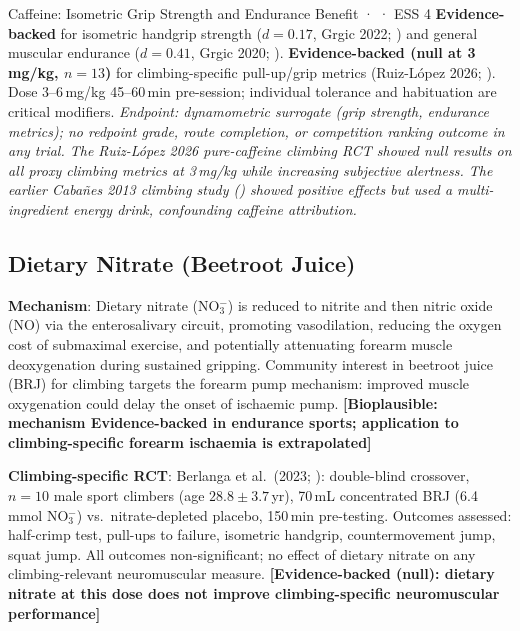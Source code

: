 \begin{evidencebox}{Caffeine: Isometric Grip Strength and Endurance Benefit · \evidencebacked · ESS 4}
\textbf{Evidence-backed} for isometric handgrip strength ($d{=}0.17$, Grgic 2022; \cite{Grg22}) and general muscular endurance ($d{=}0.41$, Grgic 2020; \cite{GGP+19}). \textbf{Evidence-backed (null at 3\,mg/kg, $n{=}13$)} for climbing-specific pull-up/grip metrics (Ruiz-L\'opez 2026; \cite{RLMAMR+26}). Dose 3--6\,mg/kg 45--60\,min pre-session; individual tolerance and habituation are critical modifiers. \textit{Endpoint: dynamometric surrogate (grip strength, endurance metrics); no redpoint grade, route completion, or competition ranking outcome in any trial. The Ruiz-L\'opez 2026 pure-caffeine climbing RCT showed null results on all proxy climbing metrics at 3\,mg/kg while increasing subjective alertness. The earlier Caba{\~n}es 2013 climbing study (\cite{Cab13}) showed positive effects but used a multi-ingredient energy drink, confounding caffeine attribution.}
\end{evidencebox}

\subsection{Dietary Nitrate (Beetroot Juice)}
\label{subsec:nitrate}

\textbf{Mechanism}: Dietary nitrate (NO$_3^-$) is reduced to nitrite and then nitric oxide (NO) via the enterosalivary circuit, promoting vasodilation, reducing the oxygen cost of submaximal exercise, and potentially attenuating forearm muscle deoxygenation during sustained gripping. Community interest in beetroot juice (BRJ) for climbing targets the forearm pump mechanism: improved muscle oxygenation could delay the onset of ischaemic pump. \textbf{[Bioplausible: mechanism Evidence-backed in endurance sports; application to climbing-specific forearm ischaemia is extrapolated]}

\textbf{Climbing-specific RCT}: Berlanga et al.\ (2023; \cite{BLSML+23}): double-blind crossover, $n{=}10$ male sport climbers (age $28.8{\pm}3.7$\,yr), 70\,mL concentrated BRJ (6.4\,mmol NO$_3^-$) vs.\ nitrate-depleted placebo, 150\,min pre-testing. Outcomes assessed: half-crimp test, pull-ups to failure, isometric handgrip, countermovement jump, squat jump. All outcomes non-significant; no effect of dietary nitrate on any climbing-relevant neuromuscular measure. \textbf{[Evidence-backed (null): dietary nitrate at this dose does not improve climbing-specific neuromuscular performance]}

